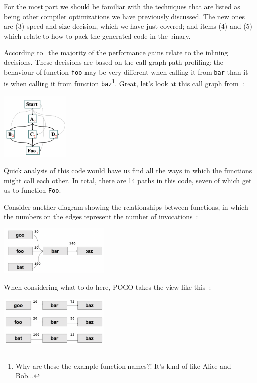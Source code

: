 \documentclass[a4paper]{report}
\begin{document}
For the most part we should be familiar with the techniques that are listed as being other compiler optimizations we have previously discussed. The new ones are (3) speed and size decision, which we have just covered; and items (4) and (5) which relate to how to pack the generated code in the binary.

According to~\cite{pogo2} the majority of the performance gains relate to the inlining decisions. These decisions are based on the call graph path profiling: the behaviour of function \texttt{foo} may be very different when calling it from \texttt{bar} than it is when calling it from function \texttt{baz}\footnote{Why are these the example function names?! It's kind of like Alice and Bob...}. Great, let's look at this call graph from~\cite{pogo2}:

\begin{center}
	\includegraphics[width=0.25\textwidth]{images/callpaths.png}
\end{center}

Quick analysis of this code would have us find all the ways in which the functions might call each other. In total, there are 14 paths in this code, seven of which get us to function \texttt{Foo}.  

Consider another diagram showing the relationships between functions, in which the numbers on the edges represent the number of invocations~\cite{pogo2}:

\begin{center}
	\includegraphics[width=0.4\textwidth]{images/callpaths2.png}
\end{center}

When considering what to do here, POGO takes the view like this~\cite{pogo2}:

\begin{center}
	\includegraphics[width=0.4\textwidth]{images/callpaths3.png}
\end{center}
\end{document}
